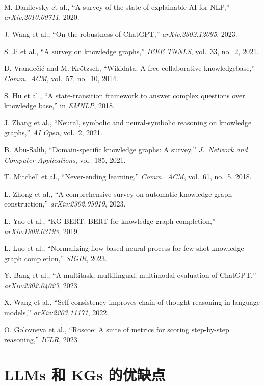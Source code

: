 \documentclass[11pt,UTF8,fontset=fandol]{ctexart}
\begin{document}
\begin{enumerate}[leftmargin=2em,label={[\arabic*]}]
\item M. Danilevsky et al., ``A survey of the state of explainable AI for NLP,'' \textit{arXiv:2010.00711}, 2020.
\item J. Wang et al., ``On the robustness of ChatGPT,'' \textit{arXiv:2302.12095}, 2023.
\item S. Ji et al., ``A survey on knowledge graphs,'' \textit{IEEE TNNLS}, vol.~33, no.~2, 2021.
\item D. Vrande\v{c}i\'{c} and M. Kr\"{o}tzsch, ``Wikidata: A free collaborative knowledgebase,'' \textit{Comm.\ ACM}, vol.~57, no.~10, 2014.
\item S. Hu et al., ``A state-transition framework to answer complex questions over knowledge base,'' in \textit{EMNLP}, 2018.
\item J. Zhang et al., ``Neural, symbolic and neural-symbolic reasoning on knowledge graphs,'' \textit{AI Open}, vol.~2, 2021.
\item B. Abu-Salih, ``Domain-specific knowledge graphs: A survey,'' \textit{J.\ Network and Computer Applications}, vol.~185, 2021.
\item T. Mitchell et al., ``Never-ending learning,'' \textit{Comm.\ ACM}, vol.~61, no.~5, 2018.
\item L. Zhong et al., ``A comprehensive survey on automatic knowledge graph construction,'' \textit{arXiv:2302.05019}, 2023.
\item L. Yao et al., ``KG-BERT: BERT for knowledge graph completion,'' \textit{arXiv:1909.03193}, 2019.
\item L. Luo et al., ``Normalizing flow-based neural process for few-shot knowledge graph completion,'' \textit{SIGIR}, 2023.
\item Y. Bang et al., ``A multitask, multilingual, multimodal evaluation of ChatGPT,'' \textit{arXiv:2302.04023}, 2023.
\item X. Wang et al., ``Self-consistency improves chain of thought reasoning in language models,'' \textit{arXiv:2203.11171}, 2022.
\item O. Golovneva et al., ``Roscoe: A suite of metrics for scoring step-by-step reasoning,'' \textit{ICLR}, 2023.
\end{enumerate}

\appendix
\section{LLMs 和 KGs 的优缺点}
\end{document}
